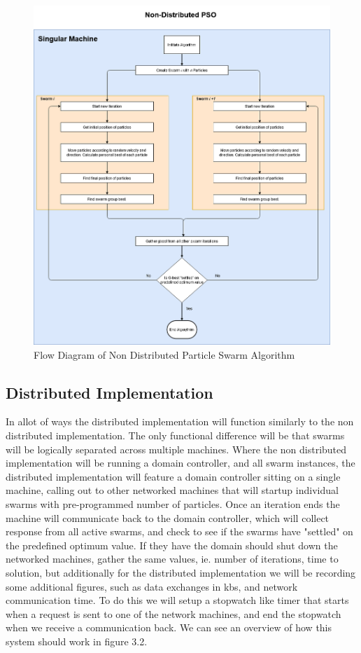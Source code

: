 \documentclass[oneside,12pt]{book}
\begin{document}
\begin{figure}[H]
    \centering
    \includegraphics[scale=0.25]{Images/FlowDiagramNonDistibutedPSO.png}
    \caption{Flow Diagram of Non Distributed Particle Swarm Algorithm}
    \label{fig:Flow Diagram of Non Distributed Particle Swarm Algorithm}
\end{figure}

\subsection{Distributed Implementation}
In allot of ways the distributed implementation will function similarly to the non distributed implementation. The only functional difference will be that swarms will be logically separated across multiple machines. Where the non distributed implementation will be running a domain controller, and all swarm instances, the distributed implementation will feature a domain controller sitting on a single machine, calling out to other networked machines that will startup individual swarms with pre-programmed number of particles. Once an iteration ends the machine will communicate back to the domain controller, which will collect response from all active swarms, and check to see if the swarms have "settled" on the predefined optimum value. 
If they have the domain should shut down the networked machines, gather the same values, ie. number of iterations, time to solution, but additionally for the distributed implementation we will be recording some additional figures, such as data exchanges in kbs, and network communication time. To do this we will setup a stopwatch like timer that starts when a request is sent to one of the network machines, and end the stopwatch when we receive a communication back. We can see an overview of how this system should work in figure 3.2.
\end{document}
